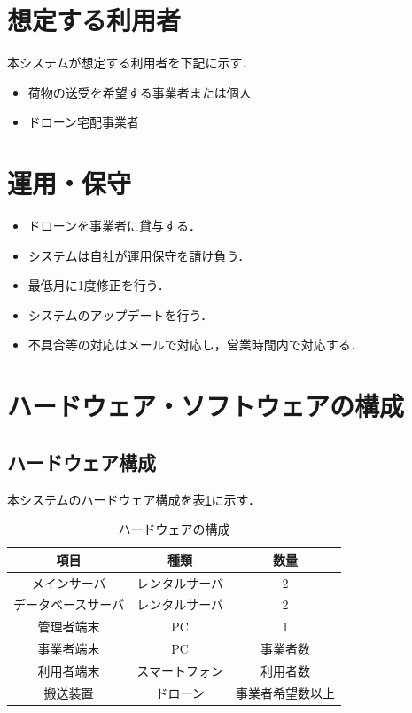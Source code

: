 \documentclass[a4paper, titlepage]{jsarticle}
\begin{document}
\section{想定する利用者}
本システムが想定する利用者を下記に示す．
\begin{itemize}
  \item 荷物の送受を希望する事業者または個人
  \item ドローン宅配事業者
\end{itemize}

\section{運用・保守}
\begin{itemize}
  \item ドローンを事業者に貸与する．
  \item システムは自社が運用保守を請け負う．
  \item 最低月に1度修正を行う．
  \item システムのアップデートを行う．
  \item 不具合等の対応はメールで対応し，営業時間内で対応する．
\end{itemize}

\section{ハードウェア・ソフトウェアの構成}
\subsection{ハードウェア構成}
本システムのハードウェア構成を表\ref{fig:hardware}に示す．
\begin{table}[H]
  \begin{center}
    \caption{ハードウェアの構成}
    \label{fig:hardware}
    \begin{tabular}{ccc} \hline
      項目        & 種類      & 数量       \\ \hline \hline
      メインサーバ    & レンタルサーバ & 2        \\
      データベースサーバ & レンタルサーバ & 2        \\
      管理者端末     & PC      & 1        \\
      事業者端末     & PC      & 事業者数     \\
      利用者端末     & スマートフォン & 利用者数     \\
      搬送装置      & ドローン    & 事業者希望数以上 \\ \hline
    \end{tabular}
  \end{center}
\end{table}
\end{document}
